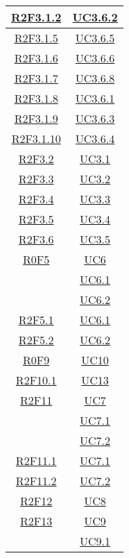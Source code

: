\begin{longtable}{|c|c|}
\hline
\hyperlink{R2F3.1.2}{R2F3.1.2} & \hyperlink{UC3.6.2}{UC3.6.2}\\
\hline
\hyperlink{R2F3.1.5}{R2F3.1.5} & \hyperlink{UC3.6.5}{UC3.6.5}\\
\hline
\hyperlink{R2F3.1.6}{R2F3.1.6} & \hyperlink{UC3.6.6}{UC3.6.6}\\
\hline
\hyperlink{R2F3.1.7}{R2F3.1.7} & \hyperlink{UC3.6.8}{UC3.6.8}\\
\hline
\hyperlink{R2F3.1.8}{R2F3.1.8} & \hyperlink{UC3.6.1}{UC3.6.1}\\
\hline
\hyperlink{R2F3.1.9}{R2F3.1.9} & \hyperlink{UC3.6.3}{UC3.6.3}\\
\hline
\hyperlink{R2F3.1.10}{R2F3.1.10} & \hyperlink{UC3.6.4}{UC3.6.4}\\
\hline
\hyperlink{R2F3.2}{R2F3.2} & \hyperlink{UC3.1}{UC3.1}\\
\hline
\hyperlink{R2F3.3}{R2F3.3} & \hyperlink{UC3.2}{UC3.2}\\
\hline
\hyperlink{R2F3.4}{R2F3.4} & \hyperlink{UC3.3}{UC3.3}\\
\hline
\hyperlink{R2F3.5}{R2F3.5} & \hyperlink{UC3.4}{UC3.4}\\
\hline
\hyperlink{R2F3.6}{R2F3.6} & \hyperlink{UC3.5}{UC3.5}\\
\hline
\hyperlink{R0F5}{R0F5} & \hyperlink{UC6}{UC6}\\
& \hyperlink{UC6.1}{UC6.1}\\
& \hyperlink{UC6.2}{UC6.2}\\
\hline
\hyperlink{R2F5.1}{R2F5.1} & \hyperlink{UC6.1}{UC6.1}\\
\hline
\hyperlink{R2F5.2}{R2F5.2} & \hyperlink{UC6.2}{UC6.2}\\
\hline
\hyperlink{R0F9}{R0F9} & \hyperlink{UC10}{UC10}\\
\hline
\hyperlink{R2F10.1}{R2F10.1} & \hyperlink{UC13}{UC13}\\
\hline
\hyperlink{R2F11}{R2F11} & \hyperlink{UC7}{UC7}\\
& \hyperlink{UC7.1}{UC7.1}\\
& \hyperlink{UC7.2}{UC7.2}\\
\hline
\hyperlink{R2F11.1}{R2F11.1} & \hyperlink{UC7.1}{UC7.1}\\
\hline
\hyperlink{R2F11.2}{R2F11.2} & \hyperlink{UC7.2}{UC7.2}\\
\hline
\hyperlink{R2F12}{R2F12} & \hyperlink{UC8}{UC8}\\
\hline
\hyperlink{R2F13}{R2F13} & \hyperlink{UC9}{UC9}\\
& \hyperlink{UC9.1}{UC9.1}\\

\end{longtable}
